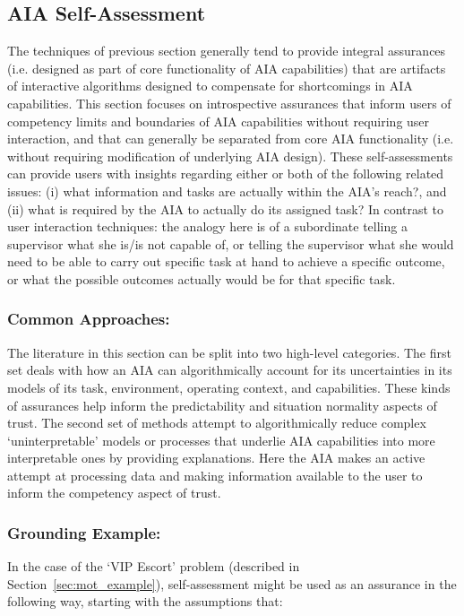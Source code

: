\subsection{AIA Self-Assessment} \label{sec:aia_self_assessment}

The techniques of previous section generally tend to provide integral assurances (i.e. designed as part of core functionality of AIA capabilities) that are artifacts of interactive algorithms designed to compensate for shortcomings in AIA capabilities. This section focuses on introspective assurances that inform users of competency limits and boundaries of AIA capabilities without requiring user interaction, and that can generally be separated from core AIA functionality (i.e. without requiring modification of underlying AIA design).  These self-assessments can provide users with insights regarding either or both of the following related issues: (i) what information and tasks are actually within the AIA's reach?, and (ii) what is required by the AIA to actually do its assigned task? 
In contrast to user interaction techniques: the analogy here is of a subordinate telling a supervisor what she is/is not capable of, or telling the supervisor what she would need to be able to carry out specific task at hand to achieve a specific outcome, or what the possible outcomes actually would be for that specific task. 

\subsubsection{Common Approaches:}
The literature in this section can be split into two high-level categories. 
The first set deals with how an AIA can algorithmically account for its uncertainties in its models of its task, environment, operating context, and capabilities. 
These kinds of assurances help inform the predictability and situation normality aspects of trust. 
The second set of methods attempt to algorithmically reduce complex `uninterpretable' models or processes that underlie AIA capabilities into more interpretable ones by providing explanations. 
Here the AIA makes an active attempt at processing data and making information available to the user to inform the competency aspect of trust. 




\subsubsection{Grounding Example:}
In the case of the `VIP Escort' problem (described in Section~\ref{sec:mot_example}), self-assessment might be used as an assurance in the following way, starting with the assumptions that:

